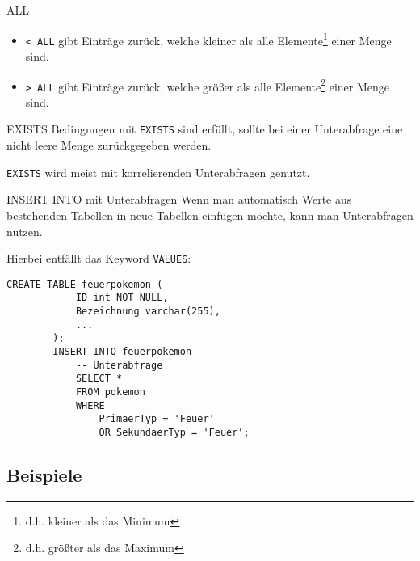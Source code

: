 \begin{sql}{ALL}
    \begin{itemize}
        \item \texttt{< ALL} gibt Einträge zurück, welche kleiner als alle Elemente\footnote{d.h. kleiner als das Minimum} einer Menge sind.
        \item \texttt{> ALL} gibt Einträge zurück, welche größer als alle Elemente\footnote{d.h. größter als das Maximum} einer Menge sind.
    \end{itemize}
\end{sql}

\begin{sql}{EXISTS}
    Bedingungen mit \texttt{EXISTS} sind erfüllt, sollte bei einer Unterabfrage eine nicht leere Menge zurückgegeben werden.   

    \texttt{EXISTS} wird meist mit korrelierenden Unterabfragen genutzt.
\end{sql}

\begin{bonus}{INSERT INTO mit Unterabfragen}
    Wenn man automatisch Werte aus bestehenden Tabellen in neue Tabellen einfügen möchte, kann man Unterabfragen nutzen.

    Hierbei entfällt das Keyword \texttt{VALUES}:

    \begin{lstlisting}[language=mysql]
        CREATE TABLE feuerpokemon (
            ID int NOT NULL,
            Bezeichnung varchar(255),
            ...
        );
        INSERT INTO feuerpokemon
            -- Unterabfrage
            SELECT *
            FROM pokemon
            WHERE
                PrimaerTyp = 'Feuer'
                OR SekundaerTyp = 'Feuer';
    \end{lstlisting}
\end{bonus}

\subsection{Beispiele}

